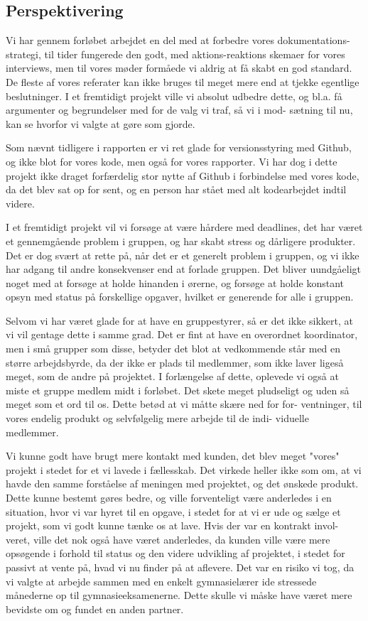 \documentclass[10pt,a4paper,danish]{article}
\begin{document}
\subsection{Perspektivering}

Vi har gennem forløbet arbejdet en del med at forbedre vores dokumentations-
strategi, til tider fungerede den godt, med aktions-reaktions skemaer for vores
interviews, men til vores møder formåede vi aldrig at få skabt en god standard.
De fleste af vores referater kan ikke bruges til meget mere end at tjekke
egentlige beslutninger. I et fremtidigt projekt ville vi absolut udbedre dette,
og bl.a. få argumenter og begrundelser med for de valg vi traf, så vi i mod-
sætning til nu, kan se hvorfor vi valgte at gøre som gjorde.

Som nævnt tidligere i rapporten er vi ret glade for versionsstyring med Github,
og ikke blot for vores kode, men også for vores rapporter. Vi har dog i dette
projekt ikke draget forfærdelig stor nytte af Github i forbindelse med vores
kode, da det blev sat op for sent, og en person har stået med alt kodearbejdet
indtil videre.

I et fremtidigt projekt vil vi forsøge at være hårdere med deadlines, det har
været et gennemgående problem i gruppen, og har skabt stress og dårligere
produkter. Det er dog svært at rette på, når det er et generelt problem i
gruppen, og vi ikke har adgang til andre konsekvenser end at forlade gruppen.
Det bliver uundgåeligt noget med at forsøge at holde hinanden i ørerne, og
forsøge at holde konstant opsyn med status på forskellige opgaver, hvilket er
generende for alle i gruppen.

Selvom vi har været glade for at have en gruppestyrer, så er det ikke sikkert,
at vi vil gentage dette i samme grad. Det er fint at have en overordnet
koordinator, men i små grupper som disse, betyder det blot at vedkommende står
med en større arbejdsbyrde, da der ikke er plads til medlemmer, som ikke laver
ligeså meget, som de andre på projektet. I forlængelse af dette, oplevede vi
også at miste et gruppe medlem midt i forløbet. Det skete meget pludseligt og
uden så meget som et ord til os. Dette betød at vi måtte skære ned for for-
ventninger, til vores endelig produkt og selvfølgelig mere arbejde til de indi-
viduelle medlemmer.

Vi kunne godt have brugt mere kontakt med kunden, det blev meget "vores" projekt
i stedet for et vi lavede i fællesskab. Det virkede heller ikke som om, at vi 
havde den samme forståelse af meningen med projektet, og det ønskede produkt.
Dette kunne bestemt gøres bedre, og ville forventeligt være anderledes i en
situation, hvor vi var hyret til en opgave, i stedet for at vi er ude og sælge
et projekt, som vi godt kunne tænke os at lave. Hvis der var en kontrakt invol-
veret, ville det nok også have været anderledes, da kunden ville være mere 
opsøgende i forhold til status og den videre udvikling af projektet, i stedet
for passivt at vente på, hvad vi nu finder på at aflevere. Det var en risiko vi
tog, da vi valgte at arbejde sammen med en enkelt gymnasielærer ide stressede
månederne op til gymnasieeksamenerne. Dette skulle vi måske have været mere
bevidste om og fundet en anden partner.
\end{document}
